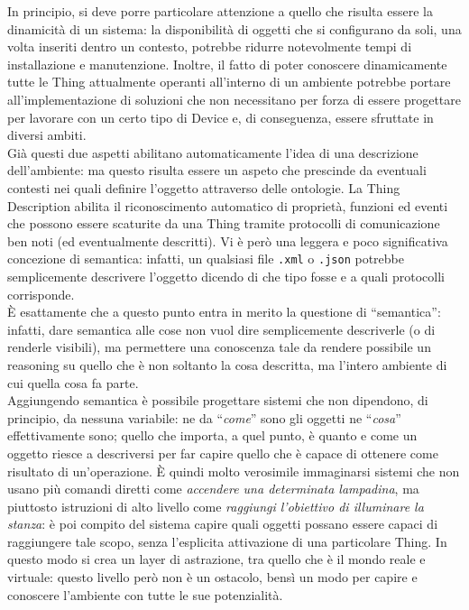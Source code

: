 \documentclass[12pt,a4paper,openright,oneside]{report}
\newcommand{\quotes}[1]{``#1''}
\begin{document}
In principio, si deve porre particolare attenzione a quello che risulta essere la dinamicità di un sistema: la disponibilità di oggetti che si configurano da soli, una volta inseriti dentro un contesto, potrebbe ridurre notevolmente tempi di installazione e manutenzione. Inoltre, il fatto di poter conoscere dinamicamente tutte le Thing attualmente operanti all'interno di un ambiente potrebbe portare all'implementazione di soluzioni che non necessitano per forza di essere progettare per lavorare con un certo tipo di Device e, di conseguenza, essere sfruttate in diversi ambiti.\\

Già questi due aspetti abilitano automaticamente l'idea di una descrizione dell'ambiente: ma questo risulta essere un aspeto che prescinde da eventuali contesti nei quali definire l'oggetto attraverso delle ontologie. La Thing Description abilita il riconoscimento automatico di proprietà, funzioni ed eventi che possono essere scaturite da una Thing tramite protocolli di comunicazione ben noti (ed eventualmente descritti). Vi è però una leggera e poco significativa concezione di semantica: infatti, un qualsiasi file \texttt{.xml} o \texttt{.json} potrebbe semplicemente descrivere l'oggetto dicendo di che tipo fosse e a quali protocolli corrisponde.\\

È esattamente che a questo punto entra in merito la questione di \quotes{semantica}: infatti, dare semantica alle cose non vuol dire semplicemente descriverle (o di renderle visibili), ma permettere una conoscenza tale da rendere possibile un reasoning su quello che è non soltanto la cosa descritta, ma l'intero ambiente di cui quella cosa fa parte.\\

Aggiungendo semantica è possibile progettare sistemi che non dipendono, di principio, da nessuna variabile: ne da \quotes{\textit{come}} sono gli oggetti ne \quotes{\textit{cosa}} effettivamente sono; quello che importa, a quel punto, è quanto e come un oggetto riesce a descriversi per far capire quello che è capace di ottenere come risultato di un'operazione. È quindi molto verosimile immaginarsi sistemi che non usano più comandi diretti come \textit{accendere una determinata lampadina}, ma piuttosto istruzioni di alto livello come \textit{raggiungi l'obiettivo di illuminare la stanza}: è poi compito del sistema capire quali oggetti possano essere capaci di raggiungere tale scopo, senza l'esplicita attivazione di una particolare Thing. In questo modo si crea un layer di astrazione, tra quello che è il mondo reale e virtuale: questo livello però non è un ostacolo, bensì un modo per capire e conoscere l'ambiente con tutte le sue potenzialità.\\
\end{document}
